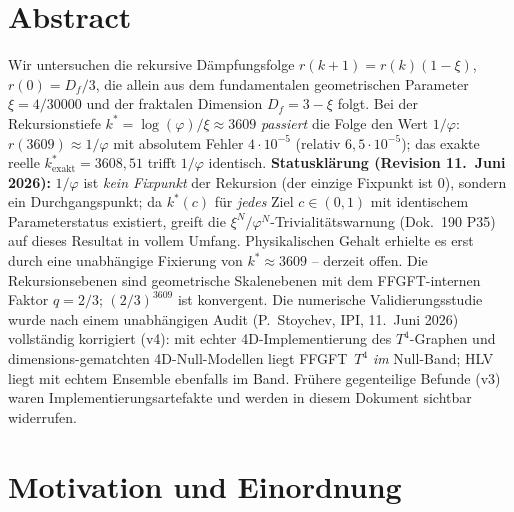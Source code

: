 
\newtheorem*{beobachtung*}{Beobachtung}

\section*{Abstract}
Wir untersuchen die rekursive Dämpfungsfolge
$r(k{+}1)=r(k)(1-\xi)$, $r(0)=D_f/3$, die allein aus dem fundamentalen
geometrischen Parameter $\xi = 4/30000$ und der fraktalen Dimension
$D_f = 3-\xi$ folgt. Bei der Rekursionstiefe
$k^* = \log(\varphi)/\xi \approx 3609$ \emph{passiert} die Folge den
Wert $1/\varphi$: $r(3609) \approx 1/\varphi$ mit absolutem Fehler
$4{\cdot}10^{-5}$ (relativ $6{,}5{\cdot}10^{-5}$); das exakte reelle
$k^*_\mathrm{exakt}=3608{,}51$ trifft $1/\varphi$ identisch.
\textbf{Statusklärung (Revision 11.~Juni 2026):} $1/\varphi$ ist
\emph{kein Fixpunkt} der Rekursion (der einzige Fixpunkt ist $0$),
sondern ein Durchgangspunkt; da $k^*(c)$ für \emph{jedes} Ziel
$c\in(0,1)$ mit identischem Parameterstatus existiert, greift die
$\xi^N/\varphi^N$-Trivialitätswarnung (Dok.~190 P35) auf dieses
Resultat in vollem Umfang. Physikalischen Gehalt erhielte es erst durch
eine unabhängige Fixierung von $k^*\approx 3609$ -- derzeit offen.
Die Rekursionsebenen sind geometrische Skalenebenen mit dem
FFGFT-internen Faktor $q = 2/3$; $(2/3)^{3609}$ ist konvergent.
Die numerische Validierungsstudie wurde nach einem unabhängigen Audit
(P.~Stoychev, IPI, 11.~Juni 2026) vollständig korrigiert (v4):
mit echter 4D-Implementierung des $T^4$-Graphen und
dimensions-gematchten 4D-Null-Modellen liegt FFGFT~$T^4$ \emph{im}
Null-Band; HLV liegt mit echtem Ensemble ebenfalls im Band. Frühere
gegenteilige Befunde (v3) waren Implementierungsartefakte und werden
in diesem Dokument sichtbar widerrufen.

\section{Motivation und Einordnung}

